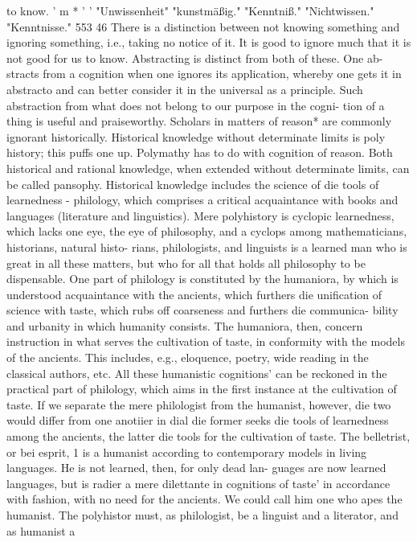 to know.
'
m
*
'
'
"Unwissenheit"
"kunstmäßig."
"Kenntniß."
"Nichtwissen."
"Kenntnisse."
553
46
There is a distinction between not knowing something and ignoring
something, i.e., taking no notice of it. It is good to ignore much that it is not
good for us to know. Abstracting is distinct from both of these. One ab-
stracts from a cognition when one ignores its application, whereby one
gets it in abstracto and can better consider it in the universal as a principle.
Such abstraction from what does not belong to our purpose in the cogni-
tion of a thing is useful and praiseworthy.
Scholars in matters of reason* are commonly ignorant historically.
Historical knowledge without determinate limits is poly history; this puffs
one up. Polymathy has to do with cognition of reason. Both historical and
rational knowledge, when extended without determinate limits, can be
called pansophy. Historical knowledge includes the science of die tools of
learnedness - philology, which comprises a critical acquaintance with
books and languages (literature and linguistics).
Mere polyhistory is cyclopic learnedness, which lacks one eye, the eye of
philosophy, and a cyclops among mathematicians, historians, natural histo-
rians, philologists, and linguists is a learned man who is great in all these
matters, but who for all that holds all philosophy to be dispensable.
One part of philology is constituted by the humaniora, by which is
understood acquaintance with the ancients, which furthers die unification
of science with taste, which rubs off coarseness and furthers die communica-
bility and urbanity in which humanity consists.
The humaniora, then, concern instruction in what serves the cultivation
of taste, in conformity with the models of the ancients. This includes, e.g.,
eloquence, poetry, wide reading in the classical authors, etc. All these
humanistic cognitions' can be reckoned in the practical part of philology,
which aims in the first instance at the cultivation of taste. If we separate
the mere philologist from the humanist, however, die two would differ
from one anotiier in dial die former seeks die tools of learnedness among
the ancients, the latter die tools for the cultivation of taste.
The belletrist, or bei esprit, 1 is a humanist according to contemporary
models in living languages. He is not learned, then, for only dead lan-
guages are now learned languages, but is radier a mere dilettante in
cognitions of taste' in accordance with fashion, with no need for the
ancients. We could call him one who apes the humanist. The polyhistor
must, as philologist, be a linguist and a literator, and as humanist a
